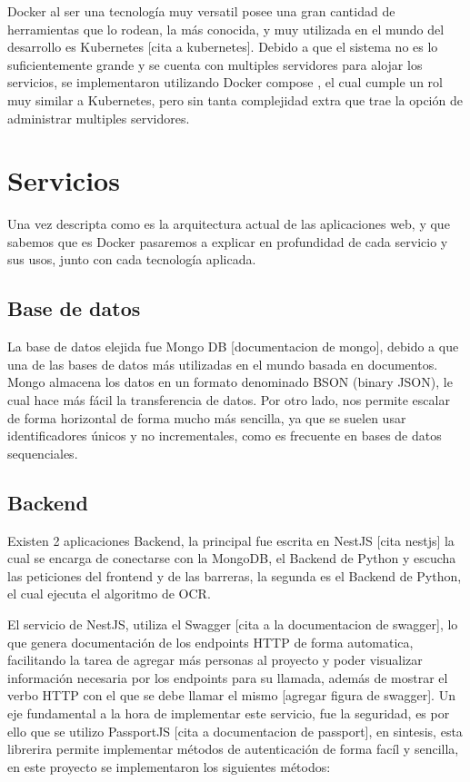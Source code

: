 Docker al ser una tecnología muy versatil posee una gran cantidad de herramientas que lo rodean, la más conocida, y muy utilizada en el mundo del desarrollo es Kubernetes [cita a kubernetes]. Debido a que el sistema no es lo suficientemente grande y se cuenta con multiples servidores para alojar los servicios, se implementaron utilizando Docker compose \cite{noauthor_docker_2023}, el cual cumple un rol muy similar a Kubernetes, pero sin tanta complejidad extra que trae la opción de administrar multiples servidores.

\section{Servicios}

Una vez descripta como es la arquitectura actual de las aplicaciones web, y que sabemos que es Docker pasaremos a explicar en profundidad de cada servicio y sus usos, junto con cada tecnología aplicada.

\subsection{Base de datos}

La base de datos elejida fue Mongo DB [documentacion de mongo], debido a que una de las bases de datos más utilizadas en el mundo basada en documentos. Mongo almacena los datos en un formato denominado BSON (binary JSON), le cual hace más fácil la transferencia de datos. Por otro lado, nos permite escalar de forma horizontal de forma mucho más sencilla, ya que se suelen usar identificadores únicos y no incrementales, como es frecuente en bases de datos sequenciales.

\subsection{Backend}

Existen 2 aplicaciones Backend, la principal fue escrita en NestJS [cita nestjs] la cual se encarga de conectarse con la MongoDB, el Backend de Python y escucha las peticiones del frontend y de las barreras, la segunda es el Backend de Python, el cual ejecuta el algoritmo de OCR.

El servicio de NestJS, utiliza el Swagger [cita  a la documentacion de swagger], lo que genera documentación de los endpoints HTTP de forma automatica, facilitando la tarea de agregar más personas al proyecto y poder visualizar información necesaria por los endpoints para su llamada, además de mostrar el verbo HTTP con el que se debe llamar el mismo [agregar figura de swagger]. Un eje fundamental a la hora de implementar este servicio, fue la seguridad, es por ello que se utilizo PassportJS [cita a documentacion de passport], en sintesis, esta librerira permite implementar métodos de autenticación de forma facíl y sencilla, en este proyecto se implementaron los siguientes métodos:

